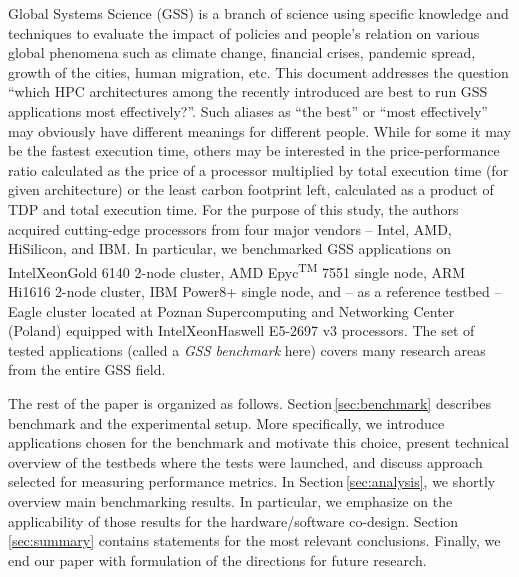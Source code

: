 Global Systems Science (GSS) is a branch of science using specific knowledge and techniques to evaluate the impact of policies and people's relation on various global phenomena such as climate change, financial crises, pandemic spread, growth of the cities, human migration, etc. This document addresses the question ``which HPC architectures among the recently introduced are best to run GSS applications most effectively?''. Such aliases as ``the best'' or ``most effectively'' may obviously have different meanings for different people. While for some it may be the fastest execution time, others may be interested in the price-performance ratio calculated as the price of a processor multiplied by total execution time (for given architecture) or the least carbon footprint left, calculated as a product of TDP and total execution time.
For the purpose of this study, the authors acquired cutting-edge processors from four major vendors -- Intel, AMD, HiSilicon, and IBM. In particular, we benchmarked GSS applications on Intel\textregistered Xeon\textregistered Gold 6140 \cite{INTELXEONGOLD6140} 2-node cluster, AMD Epyc\textsuperscript{TM} 7551 single node, ARM Hi1616 2-node cluster, IBM Power8+ \cite{IBMPOWER8} single node, and -- as a reference testbed -- Eagle cluster located at Poznan Supercomputing and Networking Center (Poland) equipped with Intel\textregistered  Xeon\textregistered Haswell E5-2697 v3 processors.
The set of tested applications (called a \textit{GSS benchmark} here) covers many research areas from the entire GSS field.

The rest of the paper is organized as follows.
Section\,\ref{sec:benchmark} describes benchmark and the experimental setup.
More specifically, we introduce applications chosen for the benchmark and motivate this choice,
present technical overview of the testbeds where the tests were launched,
and discuss approach selected for measuring performance metrics.
In Section\,\ref{sec:analysis}, we shortly overview main benchmarking results.
In particular, we emphasize on the applicability of those results for the hardware/software co-design.
Section\,\ref{sec:summary} contains statements for the most relevant conclusions.
Finally, we end our paper with formulation of the directions for future research.
